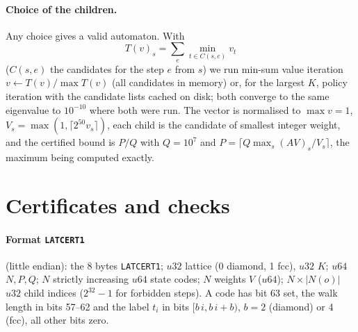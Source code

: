 \documentclass[11pt,a4paper]{report}
\begin{document}
\paragraph{Choice of the children.} Any choice gives a valid automaton. With
\[T(v)_s=\sum_e\min_{t\in C(s,e)}v_t\]
(\(C(s,e)\) the candidates for the step \(e\) from \(s\)) we run min-sum value iteration \(v\leftarrow T(v)/\max T(v)\) (all candidates
in memory) or, for the largest \(K\), policy iteration with the candidate lists cached on disk; both converge to the
same eigenvalue to \(10^{-10}\) where both were run. The vector is normalised to \(\max v=1\),
\(V_s=\max(1,\lceil2^{50}v_s\rceil)\), each child is the candidate of smallest integer weight, and the certified bound is
\(P/Q\) with \(Q=10^7\) and \(P=\lceil Q\max_s(AV)_s/V_s\rceil\), the maximum being computed exactly.

\section{Certificates and checks}\label{sec:checks}

\paragraph{Format \texttt{LATCERT1}} (little endian): the 8 bytes \texttt{LATCERT1}; \(u32\) lattice (0 diamond, 1 fcc),
\(u32\) \(K\); \(u64\) \(N,P,Q\); \(N\) strictly increasing \(u64\) state codes; \(N\) weights \(V\) (\(u64\)); \(N\times|N(o)|\)
\(u32\) child indices (\(2^{32}-1\) for forbidden steps). A code has bit 63 set, the walk length in bits 57--62 and the
label \(t_i\) in bits \([b\,i,b\,i+b)\), \(b=2\) (diamond) or 4 (fcc), all other bits zero.
\end{document}
